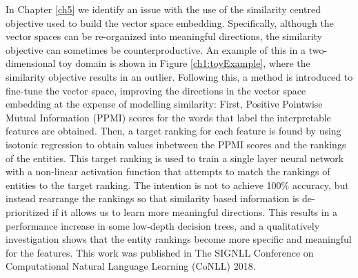 In Chapter \ref{ch5} we identify an issue with the use of the similarity centred objective used to build the vector space embedding. Specifically, although the vector spaces can be re-organized into meaningful directions, the similarity objective can sometimes be counterproductive. An example of this in a two-dimensional toy domain is shown in Figure \ref{ch1:toyExample}, where the similarity objective results in an outlier. Following this, a method is introduced to fine-tune the vector space, improving the directions in the vector space embedding at the expense of modelling similarity: First, Positive Pointwise Mutual Information (PPMI) scores for the words that label the interpretable features are obtained. Then, a target ranking for each feature is found by using isotonic regression to obtain values inbetween the PPMI scores and the rankings of the entities. This target ranking is used to train a single layer neural network with a non-linear activation function that attempts to match the rankings of entities to the target ranking. The intention is not to achieve 100\% accuracy, but instead rearrange the rankings so that similarity based information is de-prioritized if it allows us to learn more meaningful directions. This results in a performance increase in some low-depth decision trees,  and a qualitatively investigation shows that the entity rankings become more specific and meaningful for the features. This work was published in The SIGNLL Conference on Computational Natural Language Learning (CoNLL) 2018.






